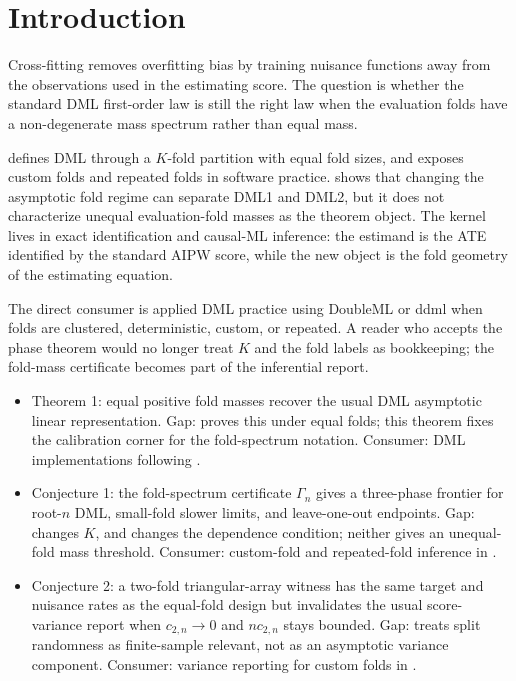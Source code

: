 \documentclass[11pt]{article}
\theoremstyle{definition}
\theoremstyle{plain}
\theoremstyle{remark}
\begin{document}
\section{Introduction}
Cross-fitting removes overfitting bias by training nuisance functions away from the observations used in the estimating score. The question is whether the standard DML first-order law is still the right law when the evaluation folds have a non-degenerate mass spectrum rather than equal mass.

\citet[Section~3.1]{ChernozhukovEtAl2018DML} defines DML through a \(K\)-fold partition with equal fold sizes, and \citet[Sections~5.2.1--5.2.3]{AhrensHansenSchafferWiemann2024DDML} exposes custom folds and repeated folds in software practice. \citet[abstract]{Velez2024DMLGrowingK} shows that changing the asymptotic fold regime can separate DML1 and DML2, but it does not characterize unequal evaluation-fold masses as the theorem object. The kernel lives in exact identification and causal-ML inference: the estimand is the ATE identified by the standard AIPW score, while the new object is the fold geometry of the estimating equation.

The direct consumer is applied DML practice using DoubleML or ddml when folds are clustered, deterministic, custom, or repeated. A reader who accepts the phase theorem would no longer treat \(K\) and the fold labels as bookkeeping; the fold-mass certificate becomes part of the inferential report.

\begin{itemize}[leftmargin=*]
\item Theorem 1: equal positive fold masses recover the usual DML asymptotic linear representation. Gap: \citet{ChernozhukovEtAl2018DML} proves this under equal folds; this theorem fixes the calibration corner for the fold-spectrum notation. Consumer: DML implementations following \citet{BachEtAl2024DoubleMLR}.
\item Conjecture 1: the fold-spectrum certificate \(\Gamma_n\) gives a three-phase frontier for root-\(n\) DML, small-fold slower limits, and leave-one-out endpoints. Gap: \citet{Velez2024DMLGrowingK} changes \(K\), and \citet{ChenSyrgkanisAustern2022NoSplitDML} changes the dependence condition; neither gives an unequal-fold mass threshold. Consumer: custom-fold and repeated-fold inference in \citet{AhrensHansenSchafferWiemann2024DDML}.
\item Conjecture 2: a two-fold triangular-array witness has the same target and nuisance rates as the equal-fold design but invalidates the usual score-variance report when \(c_{2,n}\to0\) and \(n c_{2,n}\) stays bounded. Gap: \citet{ChernozhukovEtAl2018DML} treats split randomness as finite-sample relevant, not as an asymptotic variance component. Consumer: variance reporting for custom folds in \citet{AhrensHansenSchafferWiemann2024DDML}.
\end{itemize}
\end{document}
